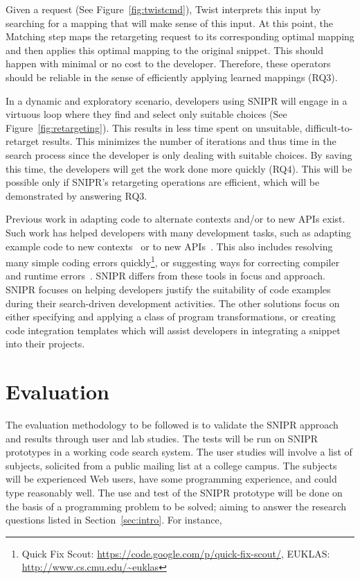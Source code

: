 \documentclass[conference]{IEEEtran}
\begin{document}
Given a request (See Figure~\ref{fig:twistcmd}), Twist interprets this input by searching for a mapping that will make sense of this input. At this point, the Matching step maps the retargeting request to its corresponding optimal mapping and then applies this optimal mapping to the original snippet. This should happen with minimal or no cost to the developer. Therefore, these operators should be reliable in the sense of efficiently applying learned mappings (RQ3).

In a dynamic and exploratory scenario, developers using \uppercase{SNIPR} will engage in a virtuous loop where they find and select only suitable choices (See Figure~\ref{fig:retargeting}). This results in less time spent on unsuitable, difficult-to-retarget results. This minimizes the number of iterations and thus time in the search process since the developer is only dealing with suitable choices. By saving this time, the developers will get the work done more quickly (RQ4). This will be possible only if \uppercase{SnipR}'s retargeting operations are efficient, which will be demonstrated by answering RQ3.

Previous work in adapting code to alternate contexts and/or to new APIs exist. Such work has helped developers with many development tasks, such as adapting example code to new contexts~\cite{Wightman:2012gc} or to new APIs~\cite{Nita:2010en}. This also includes resolving many simple coding errors quickly\footnote{{Quick Fix Scout: \url{https://code.google.com/p/quick-fix-scout/}}, {EUKLAS: \url{http://www.cs.cmu.edu/~euklas}}}, or suggesting ways for correcting compiler and runtime errors~\cite{Hartmann:2010hx}. \uppercase{SnipR} differs from these tools in focus and approach. \uppercase{SnipR} focuses on helping developers justify the suitability of code examples during their search-driven development activities. The other solutions focus on either specifying and applying a class of program transformations, or creating code integration templates which will assist developers in integrating a snippet into their projects. 

\section{Evaluation}
\label{sec:evaluate}

The evaluation methodology to be followed is to validate the \uppercase{SnipR} approach and results through user and lab studies. The tests will be run on \uppercase{SnipR} prototypes in a working code search system. The user studies will involve a list of subjects, solicited from a public mailing list at a college campus. The subjects will be experienced Web users, have some programming experience, and could type reasonably well. The use and test of the \uppercase{SnipR} prototype will be done on the basis of a programming problem to be solved; aiming to answer the research questions listed in Section~\ref{sec:intro}. For instance,
\end{document}
